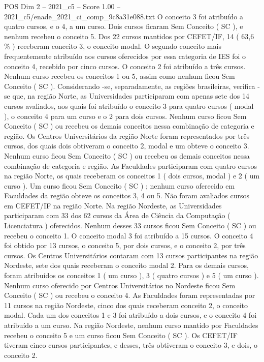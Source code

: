 \begin{textsample}{POS Dim 2 – 2021\_c5 – Score 1.00 – 2021\_c5/enade\_2021\_ci\_comp\_9c8a31e088.txt}
O conceito 3 foi atribuído a quatro cursos, e o 4, a um curso.
Dois cursos ficaram Sem Conceito ( SC ), e nenhum recebeu o conceito 5.
Dos 22 cursos mantidos por CEFET/IF, 14 ( 63,6 \% ) receberam conceito 3, o conceito modal.
O segundo conceito mais frequentemente atribuído aos cursos oferecidos por essa categoria de IES foi o conceito 4, recebido por cinco cursos.
O conceito 2 foi atribuído a três cursos.
Nenhum curso recebeu os conceitos 1 ou 5, assim como nenhum ficou Sem Conceito ( SC ).
Considerando -se, separadamente, as regiões brasileiras, verifica -se que, na região Norte, as Universidades participaram com apenas sete dos 14 cursos avaliados, aos quais foi atribuído o conceito 3 para quatro cursos ( modal ), o conceito 4 para um curso e o 2 para dois cursos.
Nenhum curso ficou Sem Conceito ( SC ) ou recebeu os demais conceitos nessa combinação de categoria e região.
Os Centros Universitários da região Norte foram representados por três cursos, dos quais dois obtiveram o conceito 2, modal e um obteve o conceito 3.
Nenhum curso ficou Sem Conceito ( SC ) ou recebeu os demais conceitos nessa combinação de categoria e região.
As Faculdades participaram com quatro cursos na região Norte, os quais receberam os conceitos 1 ( dois cursos, modal ) e 2 ( um curso ).
Um curso ficou Sem Conceito ( SC ) ; nenhum curso oferecido em Faculdades da região obteve os conceitos 3, 4 ou 5.
Não foram avaliados cursos em CEFET/IF na região Norte.
Na região Nordeste, as Universidades participaram com 33 dos 62 cursos da Área de Ciência da Computação ( Licenciatura ) oferecidos.
Nenhum desses 33 cursos ficou Sem Conceito ( SC ) ou recebeu o conceito 1.
O conceito modal 3 foi atribuído a 15 cursos.
O conceito 4 foi obtido por 13 cursos, o conceito 5, por dois cursos, e o conceito 2, por três cursos.
Os Centros Universitários contaram com 13 cursos participantes na região Nordeste, sete dos quais receberam o conceito modal 2.
Para os demais cursos, foram atribuídos os conceitos 1 ( um curso ), 3 ( quatro cursos ) e 5 ( um curso ).
Nenhum curso oferecido por Centros Universitários no Nordeste ficou Sem Conceito ( SC ) ou recebeu o conceito 4.
As Faculdades foram representadas por 11 cursos na região Nordeste, cinco dos quais receberam conceito 2, o conceito modal.
Cada um dos conceitos 1 e 3 foi atribuído a dois cursos, e o conceito 4 foi atribuído a um curso.
Na região Nordeste, nenhum curso mantido por Faculdades recebeu o conceito 5 e um curso ficou Sem Conceito ( SC ).
Os CEFET/IF tiveram cinco cursos participantes, e desses, três obtiveram o conceito 3, e dois, o conceito 2.

\end{textsample}
